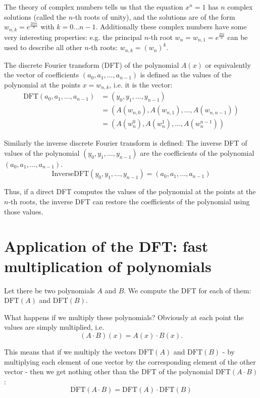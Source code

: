 \documentclass{article}
\begin{document}
The theory of complex numbers tells us that the equation $x^n = 1$ has $n$ complex solutions (called the $n$-th roots of unity), and the solutions are of the form $w_{n, k} = e^{\frac{2 k \pi i}{n}}$ with $k = 0 \dots n-1$. Additionally these complex numbers have some very interesting properties: e.g. the principal $n$-th root $w_n = w_{n, 1} = e^{\frac{2 \pi i}{n}}$ can be used to describe all other $n$-th roots: $w_{n, k} = (w_n)^k$.

The discrete Fourier transform (DFT) of the polynomial $A(x)$ or equivalently the vector of coefficients $(a_0, a_1, \dots, a_{n-1})$ is defined as the values of the polynomial at the points $x = w_{n, k}$, i.e. it is the vector:
$$\begin{align} \text{DFT}(a_0, a_1, \dots, a_{n-1}) &= (y_0, y_1, \dots, y_{n-1}) \\ &= (A(w_{n, 0}), A(w_{n, 1}), \dots, A(w_{n, n-1})) \\ &= (A(w_n^0), A(w_n^1), \dots, A(w_n^{n-1})) \end{align}$$

Similarly the inverse discrete Fourier transform is defined: The inverse DFT of values of the polynomial $(y_0, y_1, \dots, y_{n-1})$ are the coefficients of the polynomial $(a_0, a_1, \dots, a_{n-1})$.
$$\text{InverseDFT}(y_0, y_1, \dots, y_{n-1}) = (a_0, a_1, \dots, a_{n-1})$$

Thus, if a direct DFT computes the values of the polynomial at the points at the $n$-th roots, the inverse DFT can restore the coefficients of the polynomial using those values.

\section{Application of the DFT: fast multiplication of polynomials}

Let there be two polynomials $A$ and $B$. We compute the DFT for each of them: $\text{DFT}(A)$ and $\text{DFT}(B)$.

What happens if we multiply these polynomials? Obviously at each point the values are simply multiplied, i.e.
$$(A \cdot B)(x) = A(x) \cdot B(x).$$

This means that if we multiply the vectors $\text{DFT}(A)$ and $\text{DFT}(B)$ - by multiplying each element of one vector by the corresponding element of the other vector - then we get nothing other than the DFT of the polynomial $\text{DFT}(A \cdot B)$:
$$\text{DFT}(A \cdot B) = \text{DFT}(A) \cdot \text{DFT}(B)$$
\end{document}
